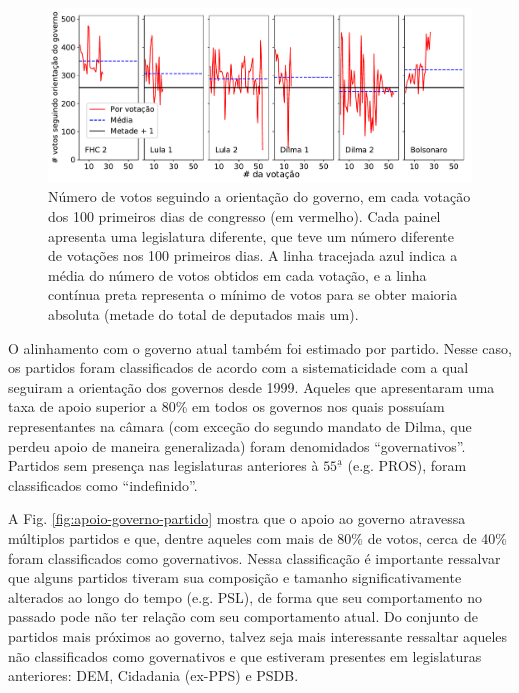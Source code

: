 \documentclass[12pt,a4paper]{article}
\begin{document}
\begin{figure}[H]
\centering
\includegraphics[width=1.0\textwidth]{graficos/apoio_ao_governo_por_votacao_2019-05-03.pdf}
\caption{Número de votos seguindo a orientação do governo, em cada votação dos 100 primeiros
  dias de congresso (em vermelho). Cada painel apresenta uma legislatura diferente, que teve
  um número diferente de votações nos 100 primeiros dias. A linha tracejada azul indica a média
  do número de votos obtidos em cada votação, e a linha contínua preta representa o mínimo de
  votos para se obter maioria absoluta (metade do total de deputados mais um).}
\label{fig:apoio-governo-votacao}
\end{figure} 

O alinhamento com o governo atual também foi estimado por partido. Nesse caso, os
partidos foram classificados de acordo com a sistematicidade com a qual seguiram
a orientação dos governos desde 1999. Aqueles que apresentaram uma taxa de apoio
superior a 80\% em todos os governos nos quais possuíam representantes na câmara
(com exceção do segundo mandato de Dilma, que perdeu apoio de maneira generalizada) foram
denomidados ``governativos''. Partidos sem presença nas legislaturas anteriores à $55^{\mathrm{\underline{a}}}$ (e.g. PROS),
foram classificados como ``indefinido''. 

A Fig. \ref{fig:apoio-governo-partido} mostra que o apoio ao governo atravessa múltiplos partidos e que,
dentre aqueles com mais de 80\% de votos, cerca de 40\% foram classificados como governativos. Nessa classificação
é importante ressalvar que alguns partidos tiveram sua composição e tamanho significativamente alterados ao longo
do tempo (e.g. PSL), de forma que seu comportamento no passado pode não ter relação com seu
comportamento atual. Do conjunto de partidos mais próximos ao governo, talvez seja mais interessante ressaltar aqueles
não classificados como governativos e que estiveram presentes em legislaturas anteriores: DEM, Cidadania (ex-PPS) e PSDB.
\end{document}
